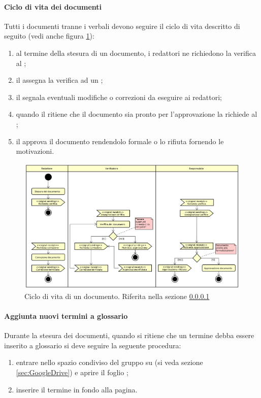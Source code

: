             \paragraph{Ciclo di vita dei documenti}\label{sec:ciclodivitadoc}
            Tutti i documenti tranne i verbali devono seguire il ciclo di vita descritto di seguito (vedi anche figura \ref{fig:ciclovitadoc}):
            \begin{enumerate}
                \item al termine della stesura di un documento, i redattori ne richiedono la verifica al \responsabile;
                \item il \responsabile{} assegna la verifica ad un \verificatore;
                \item il \verificatore{} segnala eventuali modifiche o correzioni da eseguire ai redattori;
                \item quando il \verificatore{} ritiene che il documento sia pronto per l'approvazione la richiede al \responsabile;
                \item il \responsabile{} approva il documento rendendolo formale o lo rifiuta fornendo le motivazioni.
            \end{enumerate}
            \begin{figure}[H]
		        \includegraphics[width=\textwidth]{img/ciclo_di_vita_doc}
		        \caption{Ciclo di vita di un documento. Riferita nella sezione \ref{sec:ciclodivitadoc}}
                \label{fig:ciclovitadoc}
	        \end{figure}
	        \paragraph{Aggiunta nuovi termini a glossario} \label{sec:insTermine}
	        Durante la stesura dei documenti, quando si ritiene che un termine debba essere inserito a glossario si deve seguire la seguente procedura:
	        \begin{enumerate}
	        	\item entrare nello spazio condiviso del gruppo su  (si veda sezione \ref{sec:GoogleDrive}) e aprire il foglio ;
	        	\item inserire il termine in fondo alla pagina.
	        \end{enumerate}
